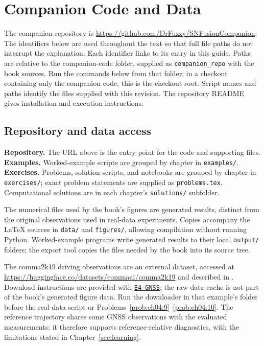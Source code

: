 \documentclass[graybox,envcountchap]{style/SNmono}
\newcommand{\repopath}[1]{\texttt{#1}}
\DeclareRobustCommand{\codeentry}[1]{\hyperref[code:#1]{\texttt{#1}}}
\begin{document}
\clearpage


\clearpage
\begingroup\color{blue}
\chapter*{Companion Code and Data}
\label{sec:companion-code}
The companion repository is \url{https://github.com/DrFuzzy/SNFusionCompanion}.
The identifiers below are used throughout the text so that full file paths do not interrupt the explanation. Each identifier links to its entry in this guide. Paths are relative to the companion-code folder, supplied as \repopath{companion\_repo} with the book sources. Run the commands below from that folder; in a checkout containing only the companion code, this is the checkout root. Script names and paths identify the files supplied with this revision. The repository README gives installation and execution instructions.

\section*{Repository and data access}
\label{code:Repository}
\textbf{Repository.} The URL above is the entry point for the code and supporting files.
\label{code:Examples}
\textbf{Examples.} Worked-example scripts are grouped by chapter in \repopath{examples/}.
\label{code:Exercises}
\textbf{Exercises.} Problems, solution scripts, and notebooks are grouped by chapter in \repopath{exercises/}; exact problem statements are supplied as \repopath{problems.tex}. Computational solutions are in each chapter's \repopath{solutions/} subfolder.

The numerical files used by the book's figures are generated results, distinct from the original observations used in real-data experiments. Copies accompany the LaTeX sources in \repopath{data/} and \repopath{figures/}, allowing compilation without running Python. Worked-example programs write generated results to their local \repopath{output/} folders; the export tool copies the files needed by the book into its source tree.

The comma2k19 driving observations are an external dataset, accessed at \url{https://huggingface.co/datasets/commaai/comma2k19} and described in \cite{schafer2018_comma2k19}. Download instructions are provided with \codeentry{E4-GNSS}; the raw-data cache is not part of the book's generated figure data. Run the downloader in that example's folder before the real-data script or Problems~\ref{prob:ch04:9}--\ref{prob:ch04:10}. The reference trajectory shares some GNSS observations with the evaluated measurements; it therefore supports reference-relative diagnostics, with the limitations stated in Chapter~\ref{sec:learning}.
\end{document}

